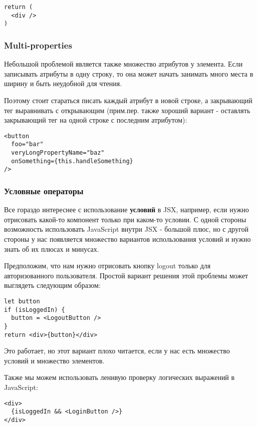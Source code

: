 \begin{lstlisting}
return (
  <div />
)
\end{lstlisting}

\subsubsection{Multi-properties}

Небольшой проблемой является также множество атрибутов у элемента. Если записывать атрибуты в одну строку, то она может начать занимать много места в ширину и быть неудобной для чтения. 

Поэтому стоит стараться писать каждый атрибут в новой строке, а закрывающий тег выравнивать с открывающим (прим.пер. также хороший вариант - оставлять закрывающий тег на одной строке с последним атрибутом):

\begin{lstlisting}
<button
  foo="bar"
  veryLongPropertyName="baz"
  onSomething={this.handleSomething}
/>
\end{lstlisting}

\subsubsection{Условные операторы}

Все гораздо интереснее с использование \textbf{условий} в JSX, например, если нужно отрисовать какой-то компонент только при каком-то условии. С одной стороны возможность использовать JavaScript внутри JSX - большой плюс, но с другой стороны у нас появляется множество вариантов использования условий и нужно знать об их плюсах и минусах.

Предположим, что нам нужно отрисовать кнопку logout только для авторизованного пользователя. Простой вариант решения этой проблемы может выглядеть следующим образом:

\begin{lstlisting}
let button
if (isLoggedIn) {
  button = <LogoutButton />
}
return <div>{button}</div>
\end{lstlisting}
   
Это работает, но этот вариант плохо читается, если у нас есть множество условий и множество элементов.

Также мы можем использовать ленивую проверку логических выражений в JavaScript:

\begin{lstlisting}
<div>
  {isLoggedIn && <LoginButton />}
</div>
\end{lstlisting}

